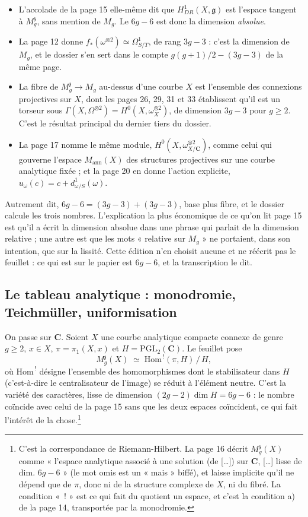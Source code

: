\documentclass[11pt,a4paper]{article}
\begin{document}
\begin{itemize}
\item L'accolade de la page 15 elle-même dit que $H^1_{DR}(X,\mathfrak{g})$
est l'espace tangent à $M_g^{\mathfrak{z}}$, sans mention de $M_g$. Le
$6g-6$ est donc la dimension \emph{absolue}.
\item La page 12 donne $f_*(\omega^{\otimes 2}) \simeq \Omega^1_{S/T}$, de
rang $3g-3$ : c'est la dimension de $M_g$, et le dossier s'en sert dans le
compte $g(g+1)/2 - (3g-3)$ de la même page.
\item La fibre de $M_g^{\mathfrak{z}} \to M_g$ au-dessus d'une courbe $X$ est
l'ensemble des connexions projectives sur $X$, dont les pages 26, 29, 31 et 33
établissent qu'il est un torseur sous $\Gamma(X, \Omega^{\otimes 2}) =
H^0(X, \omega_X^{\otimes 2})$, de dimension $3g-3$ pour $g \geqslant 2$. C'est
le résultat principal du dernier tiers du dossier.
\item La page 17 nomme le même module, $H^0(X, \omega^{\otimes 2}_{X/\mathbf{C}})$,
comme celui qui gouverne l'espace $M_{\mathrm{ann}}(X)$ des structures
projectives sur une courbe analytique fixée ; et la page 20 en donne l'action
explicite, $u_\omega(c) = c + d^1_{\omega/S}(\omega)$.
\end{itemize}

Autrement dit, $6g-6 = (3g-3) + (3g-3)$, base plus fibre, et le dossier
calcule les trois nombres. L'explication la plus économique de ce qu'on lit
page 15 est qu'il a écrit la dimension absolue dans une phrase qui parlait de
la dimension relative ; une autre est que les mots « relative sur $M_g$ » ne
portaient, dans son intention, que sur la lissité. Cette édition n'en choisit
aucune et ne réécrit pas le feuillet : ce qui est sur le papier est $6g-6$, et
la transcription le dit.

\subsection*{Le tableau analytique : monodromie, Teichmüller, uniformisation}

On passe sur $\mathbf{C}$. Soient $X$ une courbe analytique compacte connexe
de genre $g \geqslant 2$, $x \in X$, $\pi = \pi_1(X,x)$ et
$H = \mathrm{PGL}_2(\mathbf{C})$. Le feuillet pose
\[
  M_g^{\mathfrak{z}}(X) \;\simeq\;
  \mathrm{Hom}^{\,!}(\pi, H) \,\big/\, H,
\]
où $\mathrm{Hom}^{\,!}$ désigne l'ensemble des homomorphismes dont le
stabilisateur dans $H$ (c'est-à-dire le centralisateur de l'image) se réduit
à l'élément neutre. C'est la variété des caractères, lisse de dimension
$(2g-2)\dim H = 6g-6$ : le nombre coïncide avec celui de la page 15 sans que
les deux espaces coïncident, ce qui fait l'intérêt de la
chose.\footnote{C'est la correspondance de Riemann-Hilbert. La page 16 décrit
$M_g^{\mathfrak{z}}(X)$ comme « l'espace analytique associé à une solution
(de [\ldots]) sur $\mathbf{C}$, [\ldots] lisse de dim. $6g-6$ » (le mot
omis est un « mais » biffé), et laisse implicite qu'il ne dépend
que de $\pi$, donc ni de la structure complexe de $X$, ni du fibré. La
condition « $\,!$ » est ce qui fait du quotient un espace, et c'est
la condition a) de la page 14, transportée par la monodromie.}
\end{document}
